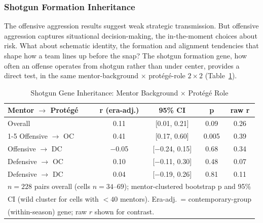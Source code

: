\documentclass[USenglish]{article}
\theoremstyle{dgthm}
\theoremstyle{dgdef}
\begin{document}
\subsubsection{Shotgun Formation Inheritance}

The offensive aggression results suggest weak strategic transmission. But offensive aggression captures situational decision-making, the in-the-moment choices about risk. What about schematic identity, the formation and alignment tendencies that shape how a team lines up before the snap? The shotgun formation gene, how often an offense operates from shotgun rather than under center, provides a direct test, in the same mentor-background $\times$ prot\'{e}g\'{e}-role $2\times2$ (Table~\ref{tab:shotgun_inherit}).

\begin{table}[H]
\caption{Shotgun Gene Inheritance: Mentor Background $\times$ Prot\'{e}g\'{e} Role}
\label{tab:shotgun_inherit}
\begin{tabular}{lcccc}
\toprule
\textbf{Mentor $\rightarrow$ Prot\'{e}g\'{e}} & \textbf{r (era-adj.)} & \textbf{95\% CI} & \textbf{p} & \textbf{raw r} \\
\midrule
Overall & 0.11 & [0.01, 0.21] & 0.09 & 0.26 \\
\cmidrule{1-5}
Offensive $\rightarrow$ OC & 0.41 & [0.17, 0.60] & 0.005 & 0.39 \\
Offensive $\rightarrow$ DC & $-$0.05 & [$-$0.24, 0.15] & 0.68 & 0.34 \\
Defensive $\rightarrow$ OC & 0.10 & [$-$0.11, 0.30] & 0.48 & 0.07 \\
Defensive $\rightarrow$ DC & 0.04 & [$-$0.19, 0.26] & 0.81 & 0.11 \\
\midrule
\multicolumn{5}{l}{\small $n=228$ pairs overall (cells $n=34$--$69$); mentor-clustered bootstrap p and 95\%}\\
\multicolumn{5}{l}{\small CI (wild cluster for cells with $<40$ mentors). Era-adj.\ = contemporary-group}\\
\multicolumn{5}{l}{\small (within-season) gene; raw $r$ shown for contrast.}\\
\bottomrule
\end{tabular}
\end{table}
\end{document}
